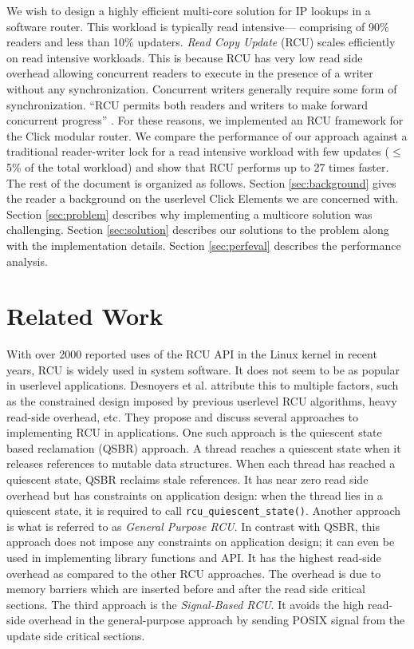 \documentclass[a4paper]{article}
\begin{document}
We wish to design a highly efficient multi-core solution for IP lookups in a software router. This workload is typically read intensive--- comprising of 90\% readers and less than 10\% updaters. \emph{Read Copy Update} (RCU) \cite{readcopyupdate} scales efficiently on read intensive workloads. This is because RCU has very low read side overhead allowing concurrent readers to execute in the presence of a writer without any synchronization. Concurrent writers generally require some form of synchronization. ``RCU permits both readers and writers to make forward concurrent progress'' \cite{urcu}. For these reasons, we implemented an RCU framework for the Click modular router. We compare the performance of our approach against a traditional reader-writer lock for a read intensive workload with few updates ($\le$ 5\% of the total workload) and show that RCU performs up to 27 times faster.\\

The rest of the document is organized as follows. Section \ref{sec:background} gives the reader a background on the userlevel Click Elements we are concerned with. Section \ref{sec:problem} describes why implementing a multicore solution was challenging. Section \ref{sec:solution} describes our solutions to the problem along with the implementation details. Section \ref{sec:perfeval} describes the performance analysis.
\section{Related Work}
With over 2000 reported uses of the RCU API \cite{rcuusage} in the Linux kernel in recent years, RCU is widely used in system software. It does not seem to be as popular in userlevel applications. Desnoyers et al. \cite{urcu} attribute this to multiple factors, such as the constrained design imposed by previous userlevel RCU algorithms, heavy read-side overhead, etc. They propose and discuss several approaches to implementing RCU in applications. One such approach is the quiescent state based reclamation (QSBR) approach. A thread reaches a quiescent state when it releases references to mutable data structures. When each thread has reached a quiescent state, QSBR reclaims stale references. It has near zero read side overhead but has constraints on application design: when the thread lies in a quiescent state, it is required to call \verb+rcu_quiescent_state()+. Another approach is what is referred to as \emph{General Purpose RCU}. In contrast with QSBR, this approach does not impose any constraints on application design; it can even be used in implementing library functions and API. It has the highest read-side overhead as compared to the other RCU approaches. The overhead is due to memory barriers which are inserted before and after the read side critical sections. The third approach is the \emph{Signal-Based RCU}. It avoids the high read-side overhead in the general-purpose approach by sending POSIX signal from the update side critical sections.
\end{document}
